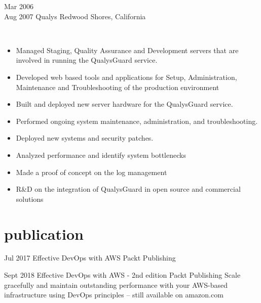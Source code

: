 \documentclass[]{cv-style}          %
\begin{document}
\newpage

\begin{entrylist}
\entry
{Mar 2006\\Aug 2007}
{Qualys}
{Redwood Shores, California}
{ \\
\begin{itemize}
\item Managed Staging, Quality Assurance and Development servers that are involved in running the QualysGuard service. 
\item Developed web based tools and applications for Setup, Administration, Maintenance and Troubleshooting of the production environment 
\item Built and deployed new server hardware for the QualysGuard service. 
\item Performed ongoing system maintenance, administration, and troubleshooting. 
\item Deployed new systems and security patches. 
\item Analyzed performance and identify system bottlenecks
\item Made a proof of concept on the log management 
\item R\&D on the integration of QualysGuard in open source and commercial solutions
\end{itemize}}
\end{entrylist}


\section{publication}

\begin{entrylist}
\entry
{Jul 2017}
{Effective DevOps with AWS}
{Packt Publishing}
{}

\entry
{Sept 2018}
{Effective DevOps with AWS - 2nd edition}
{Packt Publishing}
{Scale gracefully and maintain outstanding performance with your AWS-based infrastructure using DevOps principles -- still available on amazon.com}
\end{entrylist}
\end{document}
